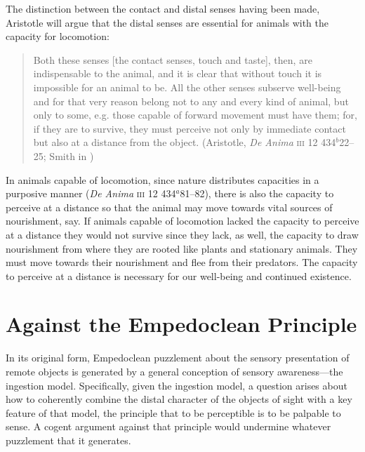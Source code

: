 The distinction between the contact and distal senses having been made, Aristotle will argue that the distal senses are essential for animals with the capacity for locomotion:
\begin{quote}
	Both these senses [the contact senses, touch and taste], then, are indispensable to the animal, and it is clear that without touch it is impossible for an animal to be. All the other senses subserve well-being and for that very reason belong not to any and every kind of animal, but only to some, e.g. those capable of forward movement must have them; for, if they are to survive, they must perceive not only by immediate contact but also at a distance from the object. (Aristotle, \emph{De Anima} \textsc{iii} 12 434\( ^{b} \)22--25; Smith in \citealt[62]{Barnes:1984uq})
\end{quote}
In animals capable of locomotion, since nature distributes capacities in a purposive manner (\emph{De Anima} \textsc{iii} 12 434\( ^{a} \)81--82), there is also the capacity to perceive at a distance so that the animal may move towards vital sources of nourishment, say. If animals capable of locomotion lacked the capacity to perceive at a distance they would not survive since they lack, as well, the capacity to draw nourishment from where they are rooted like plants and stationary animals. They must move towards their nourishment and flee from their predators. The capacity to perceive at a distance is necessary for our well-being and continued existence.



\section{Against the Empedoclean Principle} %
\label{sec:against_the_empedoclean_principle}

In its original form, Empedoclean puzzlement about the sensory presentation of remote objects is generated by a general conception of sensory awareness---the ingestion model. Specifically, given the ingestion model, a question arises about how to coherently combine the distal character of the objects of sight with a key feature of that model, the principle that to be perceptible is to be palpable to sense. A cogent argument against that principle would undermine whatever puzzlement that it generates. 

